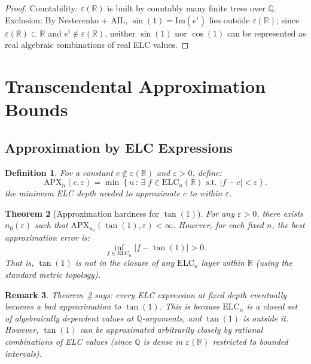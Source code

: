 \documentclass[11pt]{article}
\newtheorem{theorem}{Theorem}
\newtheorem{definition}[theorem]{Definition}
\newtheorem{remark}[theorem]{Remark}
\begin{document}
\begin{proof}
Countability: $\varepsilon(\mathbb{R})$ is built by countably many finite trees over $\mathbb{Q}$.
Exclusion: By Nesterenko + AIL, $\sin(1)=\mathrm{Im}(e^i)$ lies outside $\varepsilon(\mathbb{R})$;
since $\varepsilon(\mathbb{R})\subset\mathbb{R}$ and $e^i\notin\varepsilon(\mathbb{R})$,
neither $\sin(1)$ nor $\cos(1)$ can be represented as real algebraic combinations of
real ELC values.
\end{proof}

\section{Transcendental Approximation Bounds}

\subsection{Approximation by ELC Expressions}

\begin{definition}
For a constant $c\notin\varepsilon(\mathbb{R})$ and $\varepsilon>0$, define:
\[
\mathrm{APX}_n(c,\varepsilon)=\min\!\left\{n\,:\,\exists\;f\in\mathrm{ELC}_n(\mathbb{R})\text{ s.t. }|f-c|<\varepsilon\right\}.
\]
the minimum ELC depth needed to approximate $c$ to within $\varepsilon$.
\end{definition}

\begin{theorem}[Approximation hardness for $\tan(1)$]
\label{thm:apx}
For any $\varepsilon>0$, there exists $n_0(\varepsilon)$ such that
$\mathrm{APX}_{n_0}(\tan(1),\varepsilon)<\infty$. However, for each fixed $n$,
the best approximation error is:
\[
\inf_{f\in\mathrm{ELC}_n}\!|f-\tan(1)| > 0.
\]
That is, $\tan(1)$ is not in the closure of any $\mathrm{ELC}_n$ layer within $\mathbb{R}$
(using the standard metric topology).
\end{theorem}

\begin{remark}
Theorem~\ref{thm:apx} says: \emph{every ELC expression at fixed depth eventually becomes
a bad approximation to $\tan(1)$}. This is because $\mathrm{ELC}_n$ is a closed set
of algebraically dependent values at $\mathbb{Q}$-arguments, and $\tan(1)$ is outside it.
However, $\tan(1)$ can be approximated arbitrarily closely by rational combinations
of ELC values (since $\mathbb{Q}$ is dense in $\varepsilon(\mathbb{R})$ restricted to bounded intervals).
\end{remark}
\end{document}
